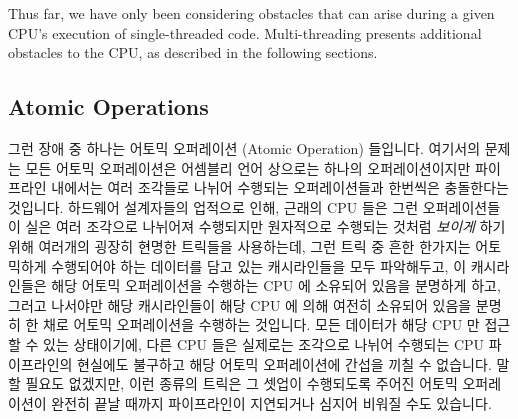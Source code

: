 Thus far, we have only been considering obstacles that can arise during
a given CPU's execution of single-threaded code.
Multi-threading presents additional obstacles to the CPU, as
described in the following sections.
\fi

\subsection{Atomic Operations}
\label{sec:cpu:Atomic Operations}

그런 장애 중 하나는 어토믹 오퍼레이션 (Atomic Operation) 들입니다.
여기서의 문제는 모든 어토믹 오퍼레이션은 어셈블리 언어 상으로는 하나의
오퍼레이션이지만 파이프라인 내에서는 여러 조각들로 나뉘어 수행되는
오퍼레이션들과 한번씩은 충돌한다는 것입니다.
하드웨어 설계자들의 업적으로 인해,
근래의 CPU 들은 그런 오퍼레이션들이 실은 여러 조각으로 나뉘어져 수행되지만
원자적으로 수행되는 것처럼 \emph{보이게} 하기 위해 여러개의 굉장히 현명한
트릭들을 사용하는데, 그런 트릭 중 흔한 한가지는 어토믹하게 수행되어야 하는
데이터를 담고 있는 캐시라인들을 모두 파악해두고, 이 캐시라인들은 해당 어토믹
오퍼레이션을 수행하는 CPU 에 소유되어 있음을 분명하게 하고, 그러고 나서야만
해당 캐시라인들이 해당 CPU 에 의해 여전히 소유되어 있음을 분명히 한 채로 어토믹
오퍼레이션을 수행하는 것입니다.
모든 데이터가 해당 CPU 만 접근할 수 있는 상태이기에, 다른 CPU 들은 실제로는
조각으로 나뉘어 수행되는 CPU 파이프라인의 현실에도 불구하고 해당 어토믹
오퍼레이션에 간섭을 끼칠 수 없습니다.
말할 필요도 없겠지만, 이런 종류의 트릭은 그 셋업이 수행되도록 주어진 어토믹
오퍼레이션이 완전히 끝날 때까지 파이프라인이 지연되거나 심지어 비워질 수도
있습니다.

